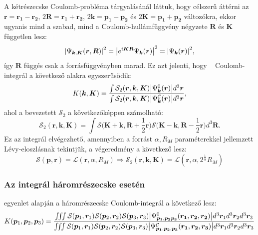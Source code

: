 \documentclass[11pt,a4paper]{article}
\numberwithin{equation}{subsection}
\numberwithin{figure}{section}
\begin{document}
A kétrészecske Coulomb-probléma tárgyalásánál láttuk, hogy célszerű áttérni az $\bm{r}=\bm{r_1}-\bm{r_2}$, $2\bm{R}=\bm{r_1}+\bm{r_2}$, $2\bm{k}=\bm{p_1}-\bm{p_2}$ és $2\bm{K}=\bm{p_1}+\bm{p_2}$ változókra, ekkor ugyanis mind a szabad, mind a Coulomb-hullámfüggvény négyzete $\bm{R}$ és  $\bm{K}$ független lesz:
\begin{equation}
\abs{\Psi_{\bm{k},\bm{K}}(\bm{r},\bm{R})}^2 = \abs{e^{i\bm{KR}}\Psi_{\bm{k}}(\bm{r})}^2=\abs{\Psi_{\bm{k}}(\bm{r})}^2,
\end{equation}
így $\bm{R}$ függés csak a forrásfüggvényben marad. Ez azt jelenti, hogy ~ Coulomb-integrál a következő alakra egyszerűsödik:
\begin{equation}
K(\bm{k},\bm{K})=
\frac{
\int \mathcal{S}_2(\bm{r}, \bm{k}, \bm{K})
\abs{\Psi^{0}_{\bm{k}}(\bm{r})} d^3 \bm{r}
}{\int \mathcal{S}_2(\bm{r}, \bm{k}, \bm{K})
\abs{\Psi^{\mathcal{C}}_{\bm{k}}(\bm{r})} d^3 \bm{r}},
\label{eq:K2}
\end{equation}
ahol a bevezetett $\mathcal{S}_2$ a következőképpen számolható:
\begin{equation}
\mathcal{S}_2(\bm{r}, \bm{k},\bm{K}) = \int \mathcal{S}\Big(\bm{K}+\bm{k}, \bm{R}+\frac{1}{2}\bm{r}\Big)\mathcal{S}\Big(\bm{K}-\bm{k}, \bm{R}-\frac{1}{2}\bm{r}\Big)d^3\bm{R}.
\end{equation}
Ez az integrál elvégezhető, amennyiben a forrást $\alpha, R_M$ paraméterekkel jellemzett Lévy-eloszlásnak tekintjük, a végeredmény a következő lesz:
\begin{equation}
\mathcal{S}(\bm{p},\bm{r})=\mathcal{L}(\bm{r},\alpha,R_M)\Longrightarrow \mathcal{S}_2(\bm{r},\bm{k},\bm{K})=\mathcal{L}(\bm{r}, \alpha, 2^{\frac{1}{\alpha}}R_M)
\end{equation}
\subsubsection{Az integrál háromrészecske esetén}
 egyenlet alapján a háromrészecske Coulomb-integrál a következő lesz:
\begin{equation}
K(\bm{p}_1,\bm{p}_2,\bm{p}_3)=
\frac{
\iiint 
\mathcal{S}(\bm{p}_1, \bm{r}_1)\mathcal{S}(\bm{p}_2, \bm{r}_2)\mathcal{S}(\bm{p}_3, \bm{r}_3)
\abs{\Psi^{0}_{\bm{p_1},\bm{p_2}\bm{p_3}}(\bm{r_1},\bm{r_2},\bm{r_2})} d^3 \bm{r}_1d^3 \bm{r}_2d^3 \bm{r}_3
}{\iiint
\mathcal{S}(\bm{p}_1, \bm{r}_1)\mathcal{S}(\bm{p}_2, \bm{r}_2)\mathcal{S}(\bm{p}_3, \bm{r}_3)
\abs{\Psi^\mathcal{C}_{\bm{p_1},\bm{p_2},\bm{p_3}}(\bm{r_1},\bm{r_2},\bm{r_3})}d^3 \bm{r}_1d^3 \bm{r}_2d^3 \bm{r}_3}
\label{eq:Kn3}
\end{equation}
\end{document}
